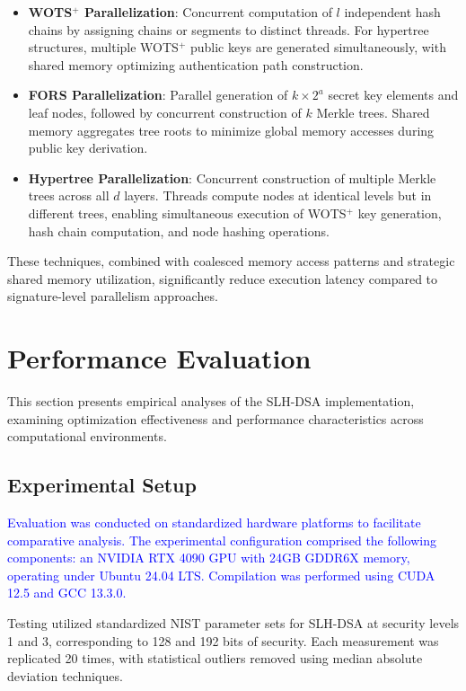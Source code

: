 \documentclass[journal]{IEEEtran}
\begin{document}
\begin{itemize}
  \item \textbf{WOTS$^+$ Parallelization}: Concurrent computation of $l$ independent hash chains by assigning chains or segments to distinct threads. For hypertree structures, multiple WOTS$^+$ public keys are generated simultaneously, with shared memory optimizing authentication path construction.

  \item \textbf{FORS Parallelization}: Parallel generation of $k \times 2^a$ secret key elements and leaf nodes, followed by concurrent construction of $k$ Merkle trees. Shared memory aggregates tree roots to minimize global memory accesses during public key derivation.

  \item \textbf{Hypertree Parallelization}: Concurrent construction of multiple Merkle trees across all $d$ layers. Threads compute nodes at identical levels but in different trees, enabling simultaneous execution of WOTS$^+$ key generation, hash chain computation, and node hashing operations.
\end{itemize}

These techniques, combined with coalesced memory access patterns and strategic shared memory utilization, significantly reduce execution latency compared to signature-level parallelism approaches.

\section{Performance Evaluation}\label{sec:evaluation}

This section presents empirical analyses of the SLH-DSA implementation, examining optimization effectiveness and performance characteristics across computational environments.

\subsection{Experimental Setup}

\textcolor{blue}{Evaluation was conducted on standardized hardware platforms to facilitate comparative analysis. The experimental configuration comprised the following components: an NVIDIA RTX 4090 GPU with 24GB GDDR6X memory, operating under Ubuntu 24.04 LTS. Compilation was performed using CUDA 12.5 and GCC 13.3.0.}

Testing utilized standardized NIST parameter sets for SLH-DSA at security levels 1 and 3, corresponding to 128 and 192 bits of security. Each measurement was replicated 20 times, with statistical outliers removed using median absolute deviation techniques.
\end{document}
